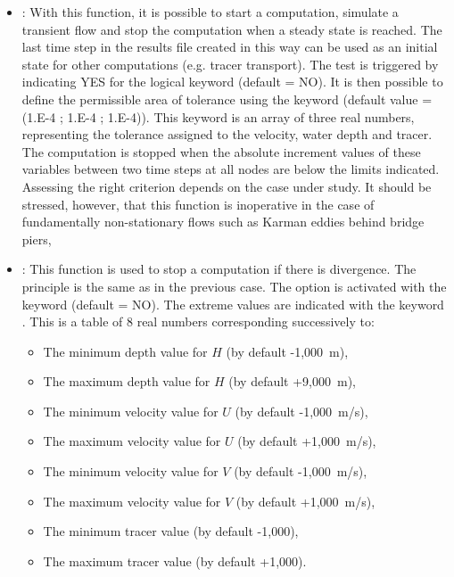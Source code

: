 \begin{itemize}
\item {}:
With this function, it is possible to start a computation, simulate a transient
flow and stop the computation when a steady state is reached.
The last time step in the results file created in this way can be used as an
initial state for other computations (e.g. tracer transport).
The test is triggered by indicating YES for the logical keyword
 (default = NO).
It is then possible to define the permissible area of tolerance
using the keyword 
(default value = (1.E-4 ; 1.E-4 ; 1.E-4)).
This keyword is an array of three real numbers, representing the tolerance
assigned to the velocity, water depth and tracer.
The computation is stopped when the absolute increment values of these variables
between two time steps at all nodes are below the limits indicated.
Assessing the right criterion depends on the case under study.
It should be stressed, however, that this function is inoperative
in the case of fundamentally non-stationary flows
such as Karman eddies behind bridge piers,

\item {}:
This function is used to stop a computation if there is divergence.
The principle is the same as in the previous case.
The option is activated with the keyword 
(default = NO).
The extreme values are indicated with the keyword .
This is a table of 8 real numbers corresponding successively to:
\begin{itemize}
\item The minimum depth value for $H$ (by default -1,000~m),

\item The maximum depth value for $H$ (by default +9,000~m),

\item The minimum velocity value for $U$ (by default -1,000~m/s),

\item The maximum velocity value for $U$ (by default +1,000~m/s),

\item The minimum velocity value for $V$ (by default -1,000~m/s),

\item The maximum velocity value for $V$ (by default +1,000~m/s),

\item The minimum tracer value (by default -1,000),

\item The maximum tracer value (by default +1,000).
\end{itemize}
\end{itemize}

